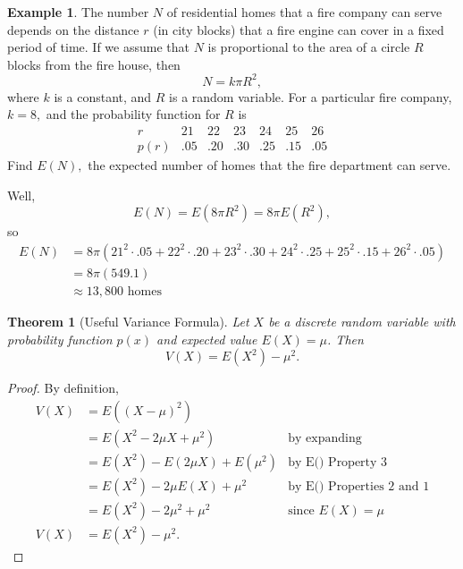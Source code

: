 \documentclass[
]{book}
\newtheorem{theorem}{Theorem}[chapter]
\theoremstyle{definition}
\theoremstyle{definition}
\newtheorem{example}{Example}[chapter]
\theoremstyle{definition}
\theoremstyle{definition}
\theoremstyle{remark}
\begin{document}
\begin{example}
\protect\hypertarget{exm:homes-near-firehouse}{}\label{exm:homes-near-firehouse}The number \(N\) of residential homes that a fire company can serve depends on the distance \(r\) (in city blocks) that a fire engine can cover in a fixed period of time. If we assume that \(N\) is proportional to the area of a circle \(R\) blocks from the fire house, then \[N = k \pi R^2,\] where \(k\) is a constant, and \(R\) is a random variable. For a particular fire company, \(k = 8,\) and the probability function for \(R\) is
\[
\begin{array}{c|c|c|c|c|c|c|c}
r    &  21 &  22 &  23 &  24 & 25 & 26 \\ \hline
p(r) & .05 & .20 & .30 & .25 & .15 & .05
\end{array}
\]
Find \(E(N),\) the expected number of homes that the fire department can serve.

Well, \[E(N) = E(8\pi R^2) = 8\pi E(R^2),\]
so
\begin{align*}
E(N) &= 8\pi\left(21^2\cdot .05 + 22^2 \cdot .20 + 23^2 \cdot .30 + 24^2 \cdot .25 + 25^2 \cdot .15 + 26^2 \cdot .05\right) \\
&= 8\pi(549.1) \\
&\approx 13,800 \text{ homes}
\end{align*}
\end{example}

\begin{theorem}[Useful Variance Formula]
\protect\hypertarget{thm:variance-shortcut}{}\label{thm:variance-shortcut}Let \(X\) be a discrete random variable with probability function \(p(x)\) and expected value \(E(X) = \mu\). Then \[V(X) = E(X^2)-\mu^2.\]
\end{theorem}

\begin{proof}
By definition,
\begin{align*}
V(X) &= E((X-\mu)^2)\\
     &= E(X^2 - 2\mu X + \mu^2) &\text{by expanding}\\
     &= E(X^2) - E(2\mu X) + E(\mu^2) &\text{by E() Property 3} \\ 
     &= E(X^2) - 2\mu E(X) + \mu^2 &\text{by E() Properties 2 and 1}\\
     &= E(X^2) - 2\mu^2 + \mu^2 & \text{since }E(X)=\mu \\
V(X) &= E(X^2) - \mu^2.
\end{align*}
\end{proof}
\end{document}
